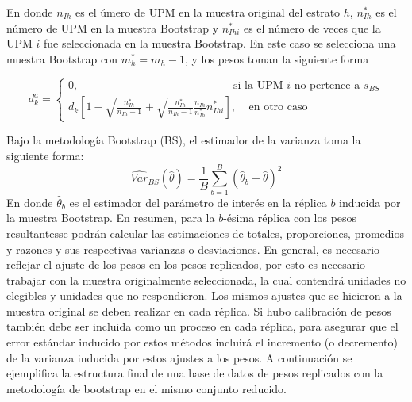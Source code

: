 \documentclass[
  12pt,
]{book}
\begin{document}
En donde \(n_{Ih}\) es el úmero de UPM en la muestra original del estrato \(h\), \(n_{Ih}^*\) es el número de UPM en la muestra Bootstrap y \(n_{Ihi}^*\) es el número de veces que la UPM \(i\) fue seleccionada en la muestra Bootstrap. En este caso se selecciona una muestra Bootstrap con \(m^*_h = m_h - 1\), y los pesos toman la siguiente forma

\[
d_k^a = 
\begin{cases}
0,  \ \ \  \ \ \ \ \ \  \ \ \  \ \ \  \ \ \  \ \ \  \ \ \  \ \ \  \ \ \  \ \ \  \ \ \  \ \ \  \ \ \  \ \ \  \ \ \ \ \ \  \ \ \  \ \ \  \ \ \  \ \ \ \text{si la UPM $i$ no pertence a $s_{BS}$} \\
d_k\left[1 - \sqrt{\frac{n_{Ih}^*}{n_{Ih}-1}}+\sqrt{\frac{n_{Ih}^*}{n_{Ih}-1}}
\frac{n_{Ih}}{n_{Ih}^*}n_{Ihi}^*
\right],  \ \ \  \ \ \text{en otro caso} 
\end{cases}
\]

Bajo la metodología Bootstrap (BS), el estimador de la varianza toma la siguiente forma:
\[
\widehat{Var}_{BS}(\hat{\theta}) = \frac{1}{B}\sum_{b=1}^B(\hat{\theta}_b - \hat\theta )^2
\]
En donde \(\hat{\theta}_b\) es el estimador del parámetro de interés en la réplica \(b\) inducida por la muestra Bootstrap. En resumen, para la \(b\)-ésima réplica con los pesos resultantesse podrán calcular las estimaciones de totales, proporciones, promedios y razones y sus respectivas varianzas o desviaciones. En general, es necesario reflejar el ajuste de los pesos en los pesos replicados, por esto es necesario trabajar con la muestra originalmente seleccionada, la cual contendrá unidades no elegibles y unidades que no respondieron. Los mismos ajustes que se hicieron a la muestra original se deben realizar en cada réplica. Si hubo calibración de pesos también debe ser incluida como un proceso en cada réplica, para asegurar que el error estándar inducido por estos métodos incluirá el incremento (o decremento) de la varianza inducida por estos ajustes a los pesos. A continuación se ejemplifica la estructura final de una base de datos de pesos replicados con la metodología de bootstrap en el mismo conjunto reducido.
\end{document}
